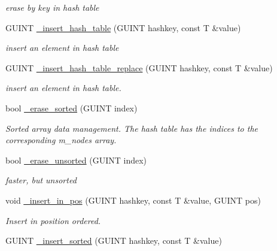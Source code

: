 \begin{DoxyCompactItemize}
\begin{DoxyCompactList}\small\item\em erase by key in hash table \end{DoxyCompactList}\item 
G\+U\+I\+N\+T \hyperlink{classgim__hash__table_a4339a279d721d1e687b8d8063332bac8}{\+\_\+insert\+\_\+hash\+\_\+table} (G\+U\+I\+N\+T hashkey, const T \&value)
\begin{DoxyCompactList}\small\item\em insert an element in hash table \end{DoxyCompactList}\item 
G\+U\+I\+N\+T \hyperlink{classgim__hash__table_a6ebfb7415bd946855ec5730651f7c191}{\+\_\+insert\+\_\+hash\+\_\+table\+\_\+replace} (G\+U\+I\+N\+T hashkey, const T \&value)
\begin{DoxyCompactList}\small\item\em insert an element in hash table. \end{DoxyCompactList}\item 
\hypertarget{classgim__hash__table_ae347a062b1b5907b81127e6bacbbb10e}{bool \hyperlink{classgim__hash__table_ae347a062b1b5907b81127e6bacbbb10e}{\+\_\+erase\+\_\+sorted} (G\+U\+I\+N\+T index)}\label{classgim__hash__table_ae347a062b1b5907b81127e6bacbbb10e}

\begin{DoxyCompactList}\small\item\em Sorted array data management. The hash table has the indices to the corresponding m\+\_\+nodes array. \end{DoxyCompactList}\item 
\hypertarget{classgim__hash__table_a0b68afa191499a10ac7d7c34230a7d89}{bool \hyperlink{classgim__hash__table_a0b68afa191499a10ac7d7c34230a7d89}{\+\_\+erase\+\_\+unsorted} (G\+U\+I\+N\+T index)}\label{classgim__hash__table_a0b68afa191499a10ac7d7c34230a7d89}

\begin{DoxyCompactList}\small\item\em faster, but unsorted \end{DoxyCompactList}\item 
void \hyperlink{classgim__hash__table_a3eacaf88e1b18815c0b89d368d77a93a}{\+\_\+insert\+\_\+in\+\_\+pos} (G\+U\+I\+N\+T hashkey, const T \&value, G\+U\+I\+N\+T pos)
\begin{DoxyCompactList}\small\item\em Insert in position ordered. \end{DoxyCompactList}\item 
\hypertarget{classgim__hash__table_a66d18cb60b0628a9aa759304395f4825}{G\+U\+I\+N\+T \hyperlink{classgim__hash__table_a66d18cb60b0628a9aa759304395f4825}{\+\_\+insert\+\_\+sorted} (G\+U\+I\+N\+T hashkey, const T \&value)}\label{classgim__hash__table_a66d18cb60b0628a9aa759304395f4825}


\end{DoxyCompactItemize}
